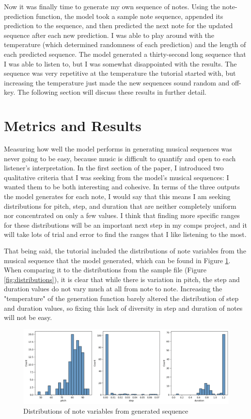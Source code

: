 \documentclass[10pt,twocolumn]{article}
\begin{document}
Now it was finally time to generate my own sequence of notes. Using the note-prediction function, the model took a sample note sequence, appended its prediction to the sequence, and then predicted the next note for the updated sequence after each new prediction. I was able to play around with the temperature (which determined randomness of each prediction) and the length of each predicted sequence. The model generated a thirty-second long sequence that I was able to listen to, but I was somewhat disappointed with the results. The sequence was very repetitive at the temperature the tutorial started with, but increasing the temperature just made the new sequences sound random and off-key. The following section will discuss these results in further detail.


\section{Metrics and Results}

Measuring how well the model performs in generating musical sequences was never going to be easy, because music is difficult to quantify and open to each listener's interpretation. In the first section of the paper, I introduced two qualitative criteria that I was seeking from the model's musical sequences: I wanted them to be both interesting and cohesive. In terms of the three outputs the model generates for each note, I would say that this means I am seeking distributions for pitch, step, and duration that are neither completely uniform nor concentrated on only a few values. I think that finding more specific ranges for these distributions will be an important next step in my comps project, and it will take lots of trial and error to find the ranges that I like listening to the most.

That being said, the tutorial included the distributions of note variables from the musical sequence that the model generated, which can be found in Figure \ref{fig:generated-dist}. When comparing it to the distributions from the sample file (Figure \ref{fig:distributions}), it is clear that while there is variation in pitch, the step and duration values do not vary much at all from note to note. Increasing the "temperature" of the generation function barely altered the distribution of step and duration values, so fixing this lack of diversity in step and duration of notes will not be easy.

\begin{figure}
    \centering
    \includegraphics[width=1\linewidth]{GeneratedDist.png}
    \caption{Distributions of note variables from generated sequence}
    \label{fig:generated-dist}
\end{figure}
\end{document}
